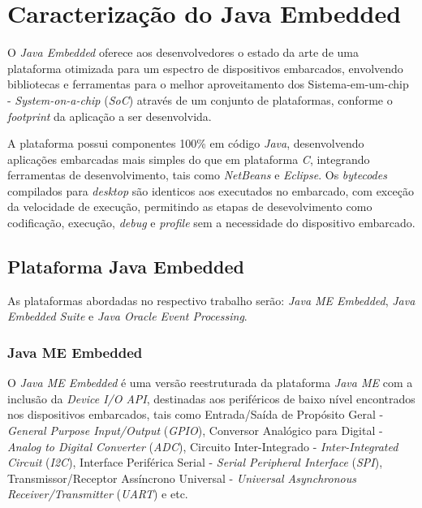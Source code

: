 %

\chapter{Caracterização do Java Embedded}

O \textit{Java Embedded} oferece aos desenvolvedores o estado da arte de uma
plataforma otimizada para um espectro de dispositivos embarcados, envolvendo
bibliotecas e ferramentas para o melhor aproveitamento dos Sistema-em-um-chip -
\textit{System-on-a-chip} (\textit{SoC}) através de um conjunto de plataformas,
conforme o \textit{footprint} da aplicação a ser desenvolvida.

A plataforma possui componentes 100\% em código \textit{Java}, desenvolvendo
aplicações embarcadas mais simples do que em plataforma \textit{C}, integrando
ferramentas de desenvolvimento, tais como \textit{NetBeans} e
\textit{Eclipse}. Os \textit{bytecodes} compilados para \textit{desktop} são
identicos aos executados no embarcado, com exceção da velocidade de execução,
permitindo as etapas de desevolvimento como codificação, execução,
\textit{debug} e \textit{profile} sem a necessidade do dispositivo embarcado.

\section{Plataforma Java Embedded}

As plataformas abordadas no respectivo trabalho serão: \textit{Java ME
  Embedded}, \textit{Java Embedded Suite} e \textit{Java Oracle Event
  Processing}.

\subsection{Java ME Embedded}

O \textit{Java ME Embedded} é uma versão reestruturada da plataforma
\textit{Java ME} com a inclusão da \textit{Device I/O API}, destinadas aos
periféricos de baixo nível encontrados nos dispositivos embarcados, tais como
Entrada/Saída de Propósito Geral - \textit{General Purpose Input/Output}
(\textit{GPIO}), Conversor Analógico para Digital - \textit{Analog to Digital
  Converter} (\textit{ADC}), Circuito Inter-Integrado -
\textit{Inter-Integrated Circuit} (\textit{I2C}), Interface Periférica Serial -
\textit{Serial Peripheral Interface} (\textit{SPI}), Transmissor/Receptor
Assíncrono Universal - \textit{Universal Asynchronous Receiver/Transmitter}
(\textit{UART}) e etc.

